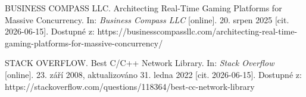 \documentclass{article}
\begin{document}
\begin{thebibliography}[20]











    BUSINESS COMPASS LLC. Architecting Real-Time Gaming Platforms for Massive Concurrency. In: \textit{Business Compass LLC} [online]. 20. srpen 2025 [cit. 2026-06-15]. Dostupné z: https://businesscompassllc.com/architecting-real-time-gaming-platforms-for-massive-concurrency/

    STACK OVERFLOW. Best C/C++ Network Library. In: \textit{Stack Overflow} [online]. 23. září 2008, aktualizováno 31. ledna 2022 [cit. 2026-06-15]. Dostupné z: https://stackoverflow.com/questions/118364/best-cc-network-library


\end{thebibliography}
\end{document}
